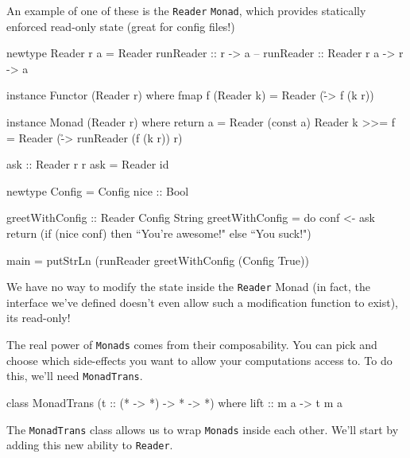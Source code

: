 \documentclass[12pt]{article}
\begin{document}

\newpage

An example of one of these is the \texttt{Reader} \texttt{Monad}, which provides
statically enforced read-only state (great for config files!)

\begin{haskell}
newtype Reader r a = Reader { runReader :: r -> a }
-- runReader :: Reader r a -> r -> a

instance Functor (Reader r) where
    fmap f (Reader k) = Reader (\r -> f (k r))

instance Monad (Reader r) where
    return a = Reader (const a)
    Reader k >>= f = Reader (\r -> runReader (f (k r)) r)

ask :: Reader r r
ask = Reader id

newtype Config = Config { nice :: Bool }

greetWithConfig :: Reader Config String
greetWithConfig = do
    conf <- ask
    return (if (nice conf) then ``You're awesome!" else ``You suck!")

main = putStrLn (runReader greetWithConfig (Config True))
\end{haskell}

We have no way to modify the state inside the \texttt{Reader} Monad (in fact, the
interface we've defined doesn't even allow such a modification function to
exist), its read-only!
\newpage

The real power of \texttt{Monads} comes from their composability. You can pick and choose
which side-effects you want to allow your computations access to. To do this,
we'll need \texttt{MonadTrans}.

\begin{haskell}
class MonadTrans (t :: (* -> *) -> * -> *) where
    lift :: m a -> t m a
\end{haskell}

The \texttt{MonadTrans} class allows us to wrap \texttt{Monads} inside each other. We'll start by
adding this new ability to \texttt{Reader}.
\end{document}
